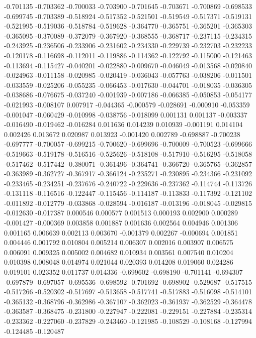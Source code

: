 -0.701135
-0.703362
-0.700033
-0.703900
-0.701645
-0.703671
-0.700869
-0.698533
-0.699745
-0.703389
-0.518924
-0.517352
-0.521501
-0.519549
-0.517371
-0.519131
-0.521995
-0.519036
-0.518784
-0.519628
-0.364770
-0.365751
-0.365201
-0.365303
-0.365095
-0.370089
-0.372079
-0.367920
-0.368555
-0.368717
-0.237115
-0.234315
-0.243925
-0.236506
-0.233906
-0.231602
-0.234330
-0.229739
-0.232703
-0.232233
-0.120178
-0.116698
-0.112011
-0.119886
-0.114362
-0.122792
-0.115000
-0.121463
-0.113694
-0.115427
-0.040201
-0.022880
-0.009670
-0.046049
-0.013568
-0.020840
-0.024963
-0.011158
-0.020985
-0.020419
-0.036043
-0.057763
-0.038206
-0.011501
-0.033559
-0.025206
-0.055235
-0.066453
-0.017630
-0.044701
-0.018035
-0.036305
-0.038686
-0.076675
-0.037240
-0.001939
-0.007186
-0.066385
-0.050853
-0.054177
-0.021993
-0.008107
0.007917
-0.044365
-0.000579
-0.028691
-0.000910
-0.053359
-0.001047
-0.060429
-0.010998
-0.038756
-0.018099
0.001131
0.001137
-0.003337
-0.016490
-0.019462
-0.016284
0.011636
0.014239
0.010939
-0.001191
0.014104
0.002426
0.013672
0.020987
0.013923
-0.001420
0.002789
-0.698887
-0.700238
-0.697777
-0.700057
-0.699215
-0.700620
-0.699696
-0.700009
-0.700523
-0.699666
-0.519663
-0.519178
-0.516516
-0.525626
-0.518108
-0.517910
-0.516295
-0.518058
-0.517462
-0.517442
-0.380071
-0.361496
-0.364741
-0.366720
-0.365765
-0.362857
-0.363989
-0.362727
-0.367917
-0.366124
-0.235271
-0.230895
-0.234366
-0.231092
-0.233465
-0.234251
-0.237676
-0.240722
-0.229636
-0.237362
-0.114744
-0.113726
-0.131118
-0.116516
-0.122447
-0.115456
-0.114187
-0.113833
-0.117392
-0.121102
-0.011892
-0.012779
-0.033868
-0.028594
-0.016187
-0.013196
-0.018045
-0.029815
-0.012630
-0.017387
0.000546
0.000577
0.001513
0.000193
0.002900
0.000289
-0.001427
-0.000369
0.003858
0.001887
0.001636
0.002564
0.004946
0.001306
0.001165
0.006639
0.002113
0.003670
-0.001379
0.002267
-0.000694
0.001851
0.004446
0.001792
0.010804
0.005214
0.006307
0.002016
0.003907
0.006575
0.006091
0.009325
0.005002
0.004682
0.010934
0.003561
0.007540
0.010204
0.010398
0.008048
0.014974
0.021044
0.020393
0.014208
0.019060
0.024286
0.019101
0.023352
0.011737
0.014336
-0.699602
-0.698190
-0.701141
-0.694307
-0.697879
-0.697057
-0.695536
-0.698592
-0.701692
-0.698902
-0.529687
-0.517515
-0.517266
-0.520302
-0.517697
-0.513658
-0.517741
-0.517883
-0.516098
-0.514101
-0.365132
-0.368796
-0.362986
-0.367107
-0.362023
-0.361937
-0.362529
-0.364478
-0.363587
-0.368475
-0.231800
-0.227947
-0.222081
-0.229151
-0.227884
-0.235314
-0.233362
-0.227060
-0.237829
-0.243460
-0.121985
-0.108529
-0.108168
-0.127994
-0.124485
-0.120487
